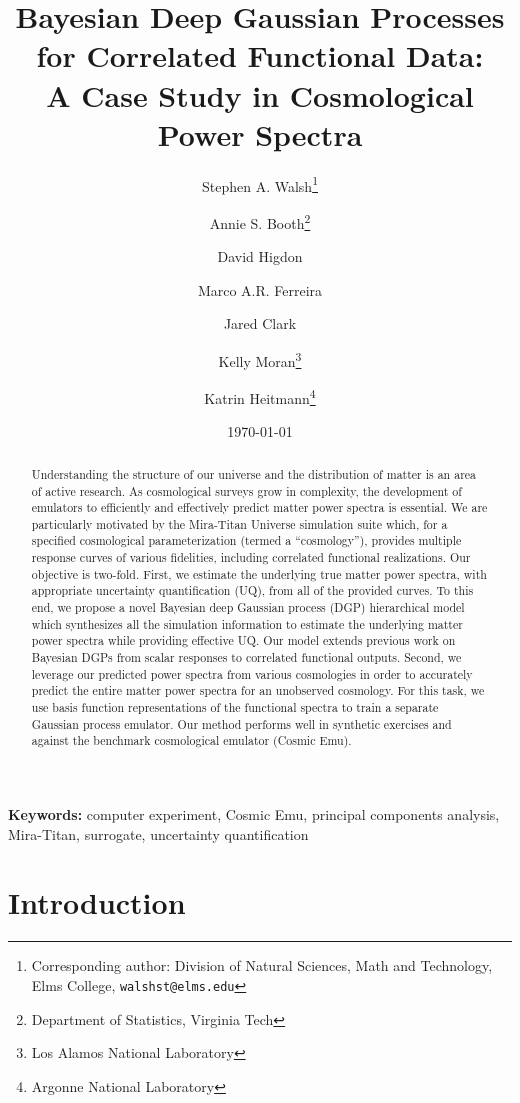\documentclass[11pt]{article}
\title{Bayesian Deep Gaussian Processes for Correlated Functional Data: \\
        A Case Study in Cosmological Power Spectra}
\author{Stephen A. Walsh\thanks{Corresponding author: Division of Natural Sciences, 
        Math and Technology, Elms College, {\tt walshst@elms.edu}} \and 
        Annie S. Booth\thanks{Department of Statistics, Virginia Tech} \and
        David Higdon\footnotemark[2] \and
        Marco A.R. Ferreira\footnotemark[2] \and
        Jared Clark\footnotemark[2] \and
        Kelly Moran\thanks{Los Alamos National Laboratory} \and
        Katrin Heitmann\thanks{Argonne National Laboratory}}
\date{\today}
\begin{document}
\maketitle
\bigskip

\begin{abstract} 
Understanding the structure of our universe and the distribution of matter is an 
area of active research.  As cosmological surveys grow in complexity, the development 
of emulators to efficiently and effectively predict matter power spectra is essential.  
We are particularly motivated by the Mira-Titan Universe simulation
suite which, for a specified cosmological parameterization (termed a ``cosmology''), 
provides multiple response curves of various fidelities, including correlated 
functional realizations.  Our objective is two-fold.  First, we estimate 
the underlying true matter power spectra, with appropriate uncertainty 
quantification (UQ), from all of the provided curves.  To this end, we propose a 
novel Bayesian deep Gaussian process (DGP) hierarchical model which synthesizes 
all the simulation information to estimate the underlying matter power spectra
while providing effective UQ.  Our model extends previous work on Bayesian DGPs 
from scalar responses to correlated functional outputs.  Second, we leverage our predicted 
power spectra from various cosmologies in order to accurately predict the entire 
matter power spectra for an 
unobserved cosmology.  For this task, we use basis function representations 
of the functional spectra to train a separate Gaussian process emulator.  
Our method performs well in synthetic exercises and against the benchmark cosmological 
emulator (Cosmic Emu).
\end{abstract}

\noindent \textbf{Keywords:} computer experiment, Cosmic Emu, 
principal components analysis, Mira-Titan, surrogate, uncertainty quantification


\section{Introduction}

\end{document}
